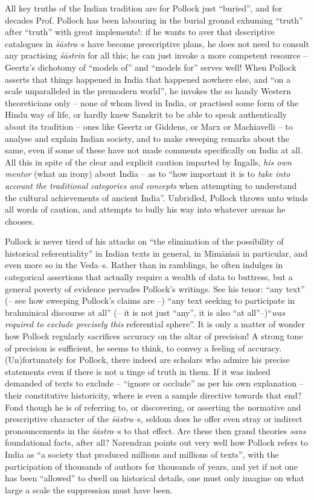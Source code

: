 All key truths of the Indian tradition are for Pollock just “buried”, and for decades Prof. Pollock has been labouring in the burial ground exhuming “truth” after “truth” with great implements!: if he wants to aver that descriptive catalogues in \textit{śāstra}–s have become prescriptive plans, he does not need to consult any practising \textit{śāstrin} for all this; he can just invoke a more competent resource – Geertz’s dichotomy of “models of” and “models for” serves well! When Pollock asserts that things happened in India that happened nowhere else, and “on a scale unparalleled in the premodern world”, he invokes the so handy Western theoreticians only – none of whom lived in India, or practised some form of the Hindu way of life, or hardly knew Sanskrit to be able to speak authentically about its tradition – ones like Geertz or Giddens, or Marx or Machiavelli – to analyse and explain Indian society, and to make sweeping remarks about the same, even if some of these have not made comments specifically on India at all. All this in spite of the clear and explicit caution imparted by Ingalls, \textit{his own mentor} (what an irony) about India – as to “how important it is to \textit{take into account the traditional categories and concepts} when attempting to understand the cultural achievements of ancient India”. Unbridled, Pollock throws unto winds all words of caution, and attempts to bully his way into whatever arenas he chooses.

Pollock is never tired of his attacks on “the elimination of the possibility of historical referentiality” in Indian texts in general, in Mīmāṁsā in particular, and even more so in the Veda–s. Rather than in ramblings, he often indulges in categorical assertions that actually require a wealth of data to buttress, but a general poverty of evidence pervades Pollock’s writings. See his tenor: “any text” (– see how sweeping Pollock’s claims are –) “any text seeking to participate in brahminical discourse at all” (– it is not just “any”, it is also “at all”–)\break “\textit{was required to exclude precisely this} referential sphere”. It is only a matter of wonder how Pollock regularly sacrifices accuracy on the altar of precision! A strong tone of precision is sufficient, he seems to think, to convey a feeling of accuracy. (Un)fortunately for Pollock, there indeed are scholars who admire his precise statements even if there is not a tinge of truth in them. If it was indeed demanded of texts to exclude – “ignore or occlude” as per his own explanation – their constitutive historicity, where is even a sample directive towards that end? Fond though he is of referring to, or discovering, or asserting the normative and prescriptive character of the \textit{śāstra}–s, seldom does he offer even stray or indirect pronouncements in the \textit{śāstra}–s to that effect. Are these then grand theories \textit{sans} foundational facts, after all? Narendran points out very well how Pollock refers to India as “a society that produced millions and millions of texts”, with the participation of thousands of authors for thousands of years, and yet if not one has been “allowed” to dwell on historical details, one must only imagine on what large a scale the suppression must have been.

